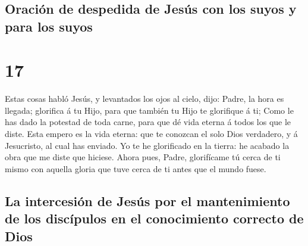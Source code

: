 \hypertarget{oraciuxf3n-de-despedida-de-jesuxfas-con-los-suyos-y-para-los-suyos}{%
\subsection{Oración de despedida de Jesús con los suyos y para los
suyos}\label{oraciuxf3n-de-despedida-de-jesuxfas-con-los-suyos-y-para-los-suyos}}

\hypertarget{section-16}{%
\section{17}\label{section-16}}

 Estas cosas habló Jesús, y levantados los ojos al cielo,
dijo: Padre, la hora es llegada; glorifica á tu Hijo, para que también
tu Hijo te glorifique á ti;  Como le has dado la potestad de
toda carne, para que dé vida eterna á todos los que le diste.
 Esta empero es la vida eterna: que te conozcan el solo Dios
verdadero, y á Jesucristo, al cual has enviado.  Yo te he
glorificado en la tierra: he acabado la obra que me diste que hiciese.
 Ahora pues, Padre, glorifícame tú cerca de ti mismo con
aquella gloria que tuve cerca de ti antes que el mundo fuese.

\hypertarget{la-intercesiuxf3n-de-jesuxfas-por-el-mantenimiento-de-los-discuxedpulos-en-el-conocimiento-correcto-de-dios}{%
\subsection{La intercesión de Jesús por el mantenimiento de los
discípulos en el conocimiento correcto de
Dios}\label{la-intercesiuxf3n-de-jesuxfas-por-el-mantenimiento-de-los-discuxedpulos-en-el-conocimiento-correcto-de-dios}}

